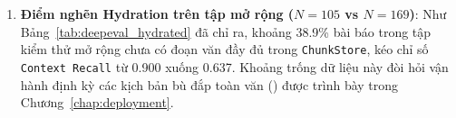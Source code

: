 \begin{enumerate}[label=\textbf{\arabic*.}]
  \item \textbf{Điểm nghẽn Hydration trên tập mở rộng ($N=105$ vs $N=169$)}:
  Như Bảng~\ref{tab:deepeval_hydrated} đã chỉ ra, khoảng 38.9\% bài báo trong tập kiểm thử mở rộng chưa có đoạn văn đầy đủ trong \texttt{ChunkStore}, kéo chỉ số \texttt{Context Recall} từ 0.900 xuống 0.637. Khoảng trống dữ liệu này đòi hỏi vận hành định kỳ các kịch bản bù đắp toàn văn () được trình bày trong Chương~\ref{chap:deployment}.
\end{enumerate}
